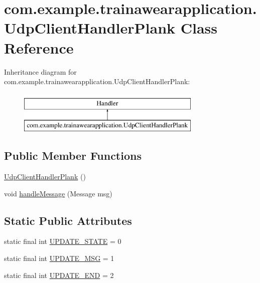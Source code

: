 \hypertarget{classcom_1_1example_1_1trainawearapplication_1_1_udp_client_handler_plank}{}\section{com.\+example.\+trainawearapplication.\+Udp\+Client\+Handler\+Plank Class Reference}
\label{classcom_1_1example_1_1trainawearapplication_1_1_udp_client_handler_plank}
Inheritance diagram for com.\+example.\+trainawearapplication.\+Udp\+Client\+Handler\+Plank\+:\begin{figure}[H]
\begin{center}
\leavevmode
\includegraphics[height=2.000000cm]{classcom_1_1example_1_1trainawearapplication_1_1_udp_client_handler_plank}
\end{center}
\end{figure}
\subsection*{Public Member Functions}
\begin{DoxyCompactItemize}
\item 
\mbox{\hyperlink{classcom_1_1example_1_1trainawearapplication_1_1_udp_client_handler_plank_a648a0fa42206709b739c8b754aa178dd}{Udp\+Client\+Handler\+Plank}} ()
\item 
void \mbox{\hyperlink{classcom_1_1example_1_1trainawearapplication_1_1_udp_client_handler_plank_a2182425709c67eae734dd1f8dc2e228c}{handle\+Message}} (Message msg)
\end{DoxyCompactItemize}
\subsection*{Static Public Attributes}
\begin{DoxyCompactItemize}
\item 
static final int \mbox{\hyperlink{classcom_1_1example_1_1trainawearapplication_1_1_udp_client_handler_plank_af27cd7ec8aca34d7c434ddaeb312f907}{U\+P\+D\+A\+T\+E\+\_\+\+S\+T\+A\+TE}} = 0
\item 
static final int \mbox{\hyperlink{classcom_1_1example_1_1trainawearapplication_1_1_udp_client_handler_plank_a74216073d90f6a9a7ab3731239f93eb3}{U\+P\+D\+A\+T\+E\+\_\+\+M\+SG}} = 1
\item 
static final int \mbox{\hyperlink{classcom_1_1example_1_1trainawearapplication_1_1_udp_client_handler_plank_a75f364bd8c7c31476d6f9d2b621765c8}{U\+P\+D\+A\+T\+E\+\_\+\+E\+ND}} = 2
\end{DoxyCompactItemize}
